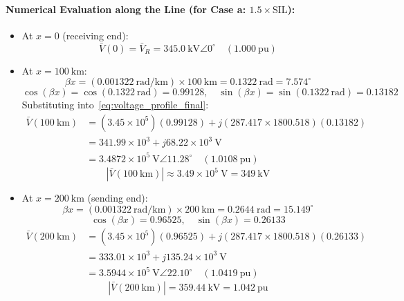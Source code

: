 \paragraph{Numerical Evaluation along the Line (for Case a: $1.5 \times \text{SIL}$):}
\begin{itemize}
    \item At $x = 0$ (receiving end):
    \[
    \bar{V}(0) = \bar{V}_R = 345.0\ \text{kV}\angle 0^\circ \quad (1.000\ \text{pu})
    \]
    
    \item At $x = 100\ \text{km}$:
    \[
    \beta x = (0.001322\ \text{rad/km}) \times 100\ \text{km} = 0.1322\ \text{rad} = 7.574^\circ
    \]
    \[
    \cos(\beta x) = \cos(0.1322\ \text{rad}) = 0.99128,\quad \sin(\beta x) = \sin(0.1322\ \text{rad}) = 0.13182
    \]
    Substituting into~\eqref{eq:voltage_profile_final}:
    \begin{align}
        \bar{V}(100\ \text{km}) &= (3.45 \times 10^5)(0.99128) + j (287.417 \times 1800.518)(0.13182) \nonumber\\
                                &= 341.99 \times 10^3 + j 68.22 \times 10^3\ \text{V} \nonumber\\
                                &= 3.4872 \times 10^5\ \text{V} \angle 11.28^\circ \quad (1.0108\ \text{pu})
    \end{align}
    \begin{equation}
        \boxed{|\bar{V}(100\ \text{km})| \approx 3.49 \times 10^5\ \text{V} = 349\ \text{kV}}
    \end{equation}

    \item At $x = 200\ \text{km}$ (sending end):
    \[
    \beta x = (0.001322\ \text{rad/km}) \times 200\ \text{km} = 0.2644\ \text{rad} = 15.149^\circ
    \]
    \[
    \cos(\beta x) = 0.96525,\quad \sin(\beta x) = 0.26133
    \]
    \begin{align}
        \bar{V}(200\ \text{km}) &= (3.45 \times 10^5)(0.96525) + j (287.417 \times 1800.518)(0.26133) \nonumber\\
                                &= 333.01 \times 10^3 + j 135.24 \times 10^3\ \text{V} \nonumber\\
                                &= 3.5944 \times 10^5\ \text{V} \angle 22.10^\circ \quad (1.0419\ \text{pu})
    \end{align}
    \begin{equation}
        \boxed{|\bar{V}(200\ \text{km})| = 359.44\ \text{kV} = 1.042\ \text{pu}}
    \end{equation}
\end{itemize}


